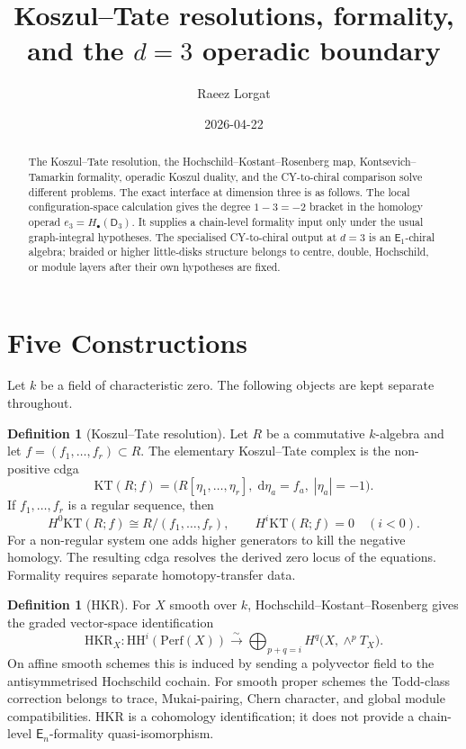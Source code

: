 \documentclass[11pt]{amsart}
\title{Koszul--Tate resolutions, formality, and the $d=3$ operadic
boundary}
\author{Raeez Lorgat}
\date{2026-04-22}
\theoremstyle{definition}
\newtheorem{definition}[theorem]{Definition}
\theoremstyle{remark}
\providecommand{\En}{\mathsf{E}_n}
\providecommand{\Eone}{\mathsf{E}_1}
\providecommand{\HH}{\mathrm{HH}}
\providecommand{\HKR}{\mathrm{HKR}}
\providecommand{\KT}{\mathrm{KT}}
\providecommand{\Perf}{\mathrm{Perf}}
\providecommand{\dd}{\mathrm{d}}
\begin{document}
\maketitle

\begin{abstract}
The Koszul--Tate resolution, the Hochschild--Kostant--Rosenberg map,
Kontsevich--Tamarkin formality, operadic Koszul duality, and the
CY-to-chiral comparison solve different problems.  The exact interface
at dimension three is as follows.  The local configuration-space
calculation gives the degree \(1-3=-2\) bracket in the homology operad
\(e_3=H_\bullet(\mathsf{D}_3)\).  It supplies a chain-level
formality input only under the usual graph-integral hypotheses.  The
specialised CY-to-chiral output at \(d=3\) is an \(\Eone\)-chiral
algebra; braided or higher little-disks structure belongs to centre,
double, Hochschild, or module layers after their own hypotheses are
fixed.
\end{abstract}

\section{Five Constructions}
\label{sec:five-constructions}

Let \(k\) be a field of characteristic zero.  The following objects are
kept separate throughout.

\begin{definition}[Koszul--Tate resolution]
\label{def:kt-resolution}
Let \(R\) be a commutative \(k\)-algebra and let
\(f=(f_1,\ldots,f_r)\subset R\).  The elementary Koszul--Tate complex is
the non-positive cdga
\[
  \KT(R;f)=\bigl(R[\eta_1,\ldots,\eta_r],\; \dd \eta_a=f_a,\;
  |\eta_a|=-1\bigr).
\]
If \(f_1,\ldots,f_r\) is a regular sequence, then
\[
  H^0\KT(R;f)\cong R/(f_1,\ldots,f_r),\qquad
  H^i\KT(R;f)=0\quad (i<0).
\]
For a non-regular system one adds higher generators to kill the
negative homology.  The resulting cdga resolves the derived zero locus
of the equations.  Formality requires separate homotopy-transfer data.
\end{definition}

\begin{definition}[HKR]
\label{def:hkr}
For \(X\) smooth over \(k\), Hochschild--Kostant--Rosenberg gives the
graded vector-space identification
\[
  \HKR_X\colon
  \HH^i(\Perf(X))
  \xrightarrow{\;\sim\;}
  \bigoplus_{p+q=i} H^q\bigl(X,\wedge^p T_X\bigr).
\]
On affine smooth schemes this is induced by sending a polyvector field
to the antisymmetrised Hochschild cochain.  For smooth proper schemes
the Todd-class correction belongs to trace, Mukai-pairing, Chern
character, and global module compatibilities.  HKR is a cohomology
identification; it does not provide a chain-level \(\En\)-formality
quasi-isomorphism.
\end{definition}
\end{document}
